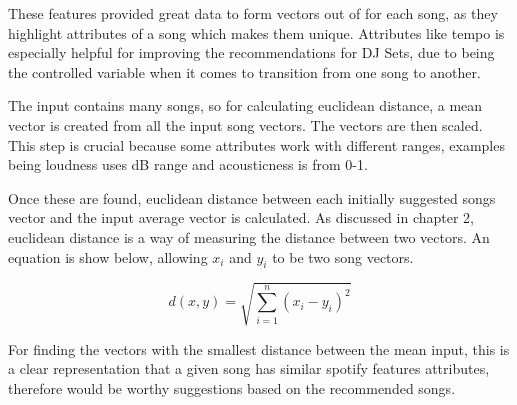 These features provided great data to form vectors out of for each song, as they highlight attributes of a song which makes them unique. Attributes like tempo is especially helpful for improving the recommendations for DJ Sets, due to being the controlled variable when it comes to transition from one song to another.

The input contains many songs, so for calculating euclidean distance, a mean vector is created from all the input song vectors. The vectors are then scaled. This step is crucial because some attributes work with different ranges, examples being loudness uses dB range and acousticness is from 0-1.

Once these are found, euclidean distance between each initially suggested songs vector and the input average vector is calculated. As discussed in chapter 2, euclidean distance is a way of measuring the distance between two vectors. An equation is show below, allowing $x_{i}$ and $y_{i}$ to be two song vectors.

\begin{equation}
	d(x,y) = \sqrt{\sum _{i=1} ^{n}(x_{i} - y_{i})^{2}}
\end{equation}

For finding the vectors with the smallest distance between the mean input, this is a clear representation that a given song has similar spotify features attributes, therefore would be worthy suggestions based on the recommended songs.

